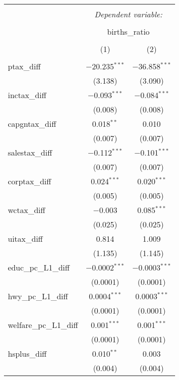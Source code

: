 
\begin{table}[!htbp] \centering 
  \caption{} 
  \label{} 
\begin{tabular}{@{\extracolsep{5pt}}lcc} 
\\[-1.8ex]\hline 
\hline \\[-1.8ex] 
 & \multicolumn{2}{c}{\textit{Dependent variable:}} \\ 
\cline{2-3} 
\\[-1.8ex] & \multicolumn{2}{c}{births\_ratio} \\ 
\\[-1.8ex] & (1) & (2)\\ 
\hline \\[-1.8ex] 
 ptax\_diff & $-$20.235$^{***}$ & $-$36.858$^{***}$ \\ 
  & (3.138) & (3.090) \\ 
  inctax\_diff & $-$0.093$^{***}$ & $-$0.084$^{***}$ \\ 
  & (0.008) & (0.008) \\ 
  capgntax\_diff & 0.018$^{**}$ & 0.010 \\ 
  & (0.007) & (0.007) \\ 
  salestax\_diff & $-$0.112$^{***}$ & $-$0.101$^{***}$ \\ 
  & (0.007) & (0.007) \\ 
  corptax\_diff & 0.024$^{***}$ & 0.020$^{***}$ \\ 
  & (0.005) & (0.005) \\ 
  wctax\_diff & $-$0.003 & 0.085$^{***}$ \\ 
  & (0.025) & (0.025) \\ 
  uitax\_diff & 0.814 & 1.009 \\ 
  & (1.135) & (1.145) \\ 
  educ\_pc\_L1\_diff & $-$0.0002$^{***}$ & $-$0.0003$^{***}$ \\ 
  & (0.0001) & (0.0001) \\ 
  hwy\_pc\_L1\_diff & 0.0004$^{***}$ & 0.0003$^{***}$ \\ 
  & (0.0001) & (0.0001) \\ 
  welfare\_pc\_L1\_diff & 0.001$^{***}$ & 0.001$^{***}$ \\ 
  & (0.0001) & (0.0001) \\ 
  hsplus\_diff & 0.010$^{**}$ & 0.003 \\ 
  & (0.004) & (0.004) \\ 

\end{tabular}
\end{table}
